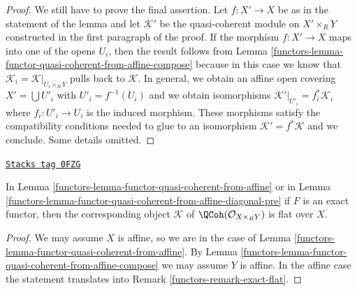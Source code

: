 \begin{proof}
\medskip\noindent
We still have to prove the final assertion. Let $f : X' \to X$
be as in the statement of the lemma and let $\mathcal{K}'$
be the quasi-coherent module on $X' \times_R Y$ constructed
in the first paragraph of the proof. If the morphism
$f : X' \to X$ maps into one of the opens $U_i$, then the
result follows from
Lemma \ref{functors-lemma-functor-quasi-coherent-from-affine-compose}
because in this case we know
that $\mathcal{K}_i = \mathcal{K}|_{U_i \times_R Y}$
pulls back to $\mathcal{K}$. In general, we obtain an
affine open covering $X' = \bigcup U'_i$ with $U'_i = f^{-1}(U_i)$
and we obtain isomorphisms
$\mathcal{K}'|_{U'_i} = f_i^*\mathcal{K}_i$ where
$f_i : U'_i \to U_i$ is the induced morphism.
These morphisms satisfy the compatibility conditions needed
to glue to an isomorphism $\mathcal{K}' = f^*\mathcal{K}$
and we conclude. Some details omitted.
\end{proof}

\begin{lemma}
\label{functors-lemma-coh-noetherian-from-affine-flat}
\href{https://stacks.math.columbia.edu/tag/0FZG}{\texttt{Stacks tag 0FZG}}

In Lemma \ref{functors-lemma-functor-quasi-coherent-from-affine}
or in Lemma \ref{functors-lemma-functor-quasi-coherent-from-affine-diagonal-pre}
if $F$ is an exact functor, then the corresponding object
$\mathcal{K}$ of $\QCoh(\mathcal{O}_{X \times_R Y})$ is flat over $X$.
\end{lemma}

\begin{proof}

We may assume $X$ is affine, so we are in the case of
Lemma \ref{functors-lemma-functor-quasi-coherent-from-affine}.
By Lemma \ref{functors-lemma-functor-quasi-coherent-from-affine-compose}
we may assume $Y$ is affine. In the affine case the statement
translates into Remark \ref{functors-remark-exact-flat}.
\end{proof}


